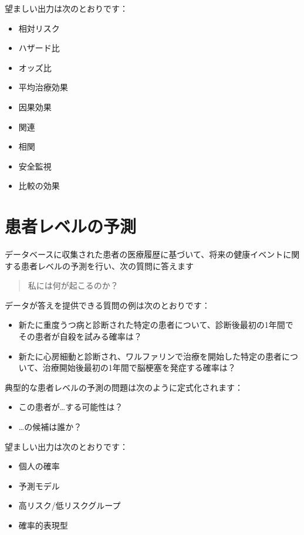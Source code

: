 \documentclass[
  11pt]{book}
\providecommand{\tightlist}{%
  \setlength{\itemsep}{0pt}\setlength{\parskip}{0pt}}
\theoremstyle{definition}
\theoremstyle{definition}
\theoremstyle{definition}
\theoremstyle{definition}
\theoremstyle{remark}
\begin{document}
望ましい出力は次のとおりです：

\begin{itemize}
\tightlist
\item
  相対リスク
\item
  ハザード比
\item
  オッズ比
\item
  平均治療効果
\item
  因果効果
\item
  関連
\item
  相関
\item
  安全監視
\item
  比較の効果
\end{itemize}

\section{患者レベルの予測}\label{ux60a3ux8005ux30ecux30d9ux30ebux306eux4e88ux6e2c}


データベースに収集された患者の医療履歴に基づいて、将来の健康イベントに関する患者レベルの予測を行い、次の質問に答えます

\begin{quote}
私には何が起こるのか？
\end{quote}

データが答えを提供できる質問の例は次のとおりです：

\begin{itemize}
\tightlist
\item
  新たに重度うつ病と診断された特定の患者について、診断後最初の1年間でその患者が自殺を試みる確率は？
\item
  新たに心房細動と診断され、ワルファリンで治療を開始した特定の患者について、治療開始後最初の1年間で脳梗塞を発症する確率は？
\end{itemize}

典型的な患者レベルの予測の問題は次のように定式化されます：

\begin{itemize}
\tightlist
\item
  この患者が\ldots する可能性は？
\item
  \ldots の候補は誰か？
\end{itemize}

望ましい出力は次のとおりです：

\begin{itemize}
\tightlist
\item
  個人の確率
\item
  予測モデル
\item
  高リスク/低リスクグループ
\item
  確率的表現型
\end{itemize}
\end{document}
